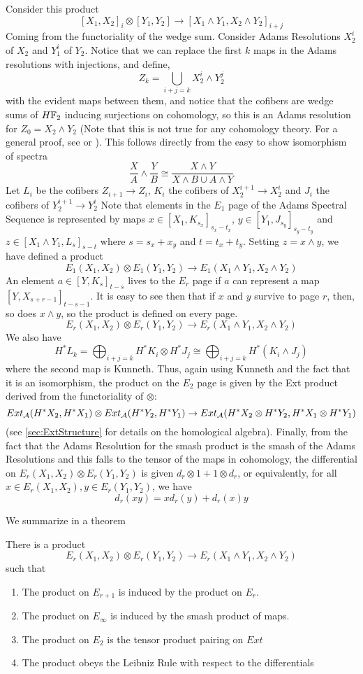 Consider this product
\[[X_1,X_2]_i\otimes[Y_1,Y_2]\to [X_1\wedge Y_1,X_2\wedge Y_2]_{i+j}\]
Coming from the functoriality of the wedge sum.  
Consider Adams Resolutions $X_2^{i}$ of $X_2$ and $Y_1^i$ of $Y_2$.  
Notice that we can replace the first $k$ maps in the Adams resolutions with injections, and define,
\[Z_k=\bigcup_{i+j=k} X_2^i\wedge Y_2^j\]
with the evident maps between them, and notice that the cofibers are wedge sums of $H\mathbb{F}_2$ inducing surjections on cohomology, so this is an Adams resolution for $Z_0=X_2\wedge Y_2$ (Note that this is not true for any cohomology theory. For a general proof, see \cite[Ch~2.3]{RavenelGreen} or \cite[Ch~IV]{H00RingSpectra}).   
This follows directly from the easy to show isomorphism of spectra
\[\frac{X}{A}\wedge \frac{Y}{B}\cong\frac{X\wedge Y}{X\wedge B\cup A\wedge Y}\]
Let $L_i$ be the cofibers $Z_{i+1}\to Z_i$, $K_i$ the cofibers of $X_2^{i+1}\to X_2^i$ and $J_i$ the cofibers of  $Y_2^{i+1}\to Y_2^i$
Note that elements in the $E_1$ page of the Adams Spectral Sequence is represented by maps $x\in [X_1,K_{s_x}]_{s_x-t_x}$, $y\in [Y_1,J_{s_y}]_{s_y-t_y}$ and $z\in [X_1\wedge Y_1,L_s]_{s-t}$ where $s=s_x+x_y$ and $t=t_x+t_y$.  Setting $z=x\wedge y$, we have defined a product
\[E_1(X_1,X_2)\otimes E_1(Y_1,Y_2)\to E_1(X_1\wedge Y_1,X_2\wedge Y_2)\]
An element $a\in [Y,K_s]_{t-s}$ lives to the $E_r$ page if $a$ can represent a map $[Y,X_{s+r-1}]_{t-s-1}$.  
It is easy to see then that if $x$ and $y$ survive to page $r$, then, so does $x\wedge y$, so the product is defined on every page.  
\[E_r(X_1,X_2)\otimes E_r(Y_1,Y_2)\to E_r(X_1\wedge Y_1,X_2\wedge Y_2)\]
We also have
\[H^*L_k=\bigoplus_{i+j=k} H^*K_i\otimes H^*J_j\cong\bigoplus_{i+j=k} H^*(K_i\wedge J_j)\]
where the second map is Kunneth. 
Thus, again using Kunneth and the fact that it is an isomorphism, the product on the $E_2$ page is given by the Ext product derived from the functoriality of $\otimes$:
\[Ext_{\mathcal{A}}(H^*X_2,H^*X_1)\otimes Ext_{\mathcal{A}}(H^*Y_2,H^*Y_1)\to Ext_{\mathcal{A}}(H^*X_2\otimes H^*Y_2,H^*X_1\otimes H^*Y_1)\]
(see \ref{sec:ExtStructure} for details on the homological algebra).  
Finally, from the fact that the Adams Resolution for the smash product is the smash of the Adams Resolutions and this falls to the tensor of the maps in cohomology, the differential on $E_r(X_1,X_2)\otimes E_r(Y_1,Y_2)$ is given $d_r\otimes 1+1\otimes d_r$, or equivalently, for all $x\in E_r(X_1,X_2),y\in  E_r(Y_1,Y_2)$, we have
\[d_r(xy)=xd_r(y)+d_r(x)y\]

We summarize in a theorem
\begin{Theorem}
  There is a product
  \[E_r(X_1,X_2)\otimes E_r(Y_1,Y_2)\to E_r(X_1\wedge Y_1,X_2\wedge Y_2)\]
  such that
  \begin{enumerate}
    \item The product on $E_{r+1}$ is induced by the product on $E_r$.
    \item The product on $E_\infty$ is induced by the smash product of maps.
    \item The product on $E_2$ is the tensor product pairing on $Ext$
    \item The product obeys the Leibniz Rule with respect to the differentials
  \end{enumerate}
\end{Theorem}


